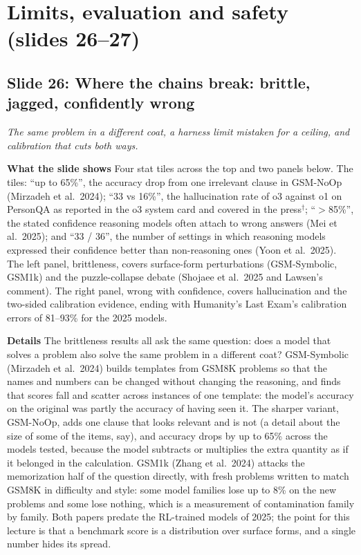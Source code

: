 \documentclass[11pt,letterpaper]{article}
\newcommand{\slide}[3]{%
  \subsection[Slide #1: #2]{Slide #1: #2}%
  {\color{muted}\itshape #3\par}\medskip}
\newcommand{\para}[1]{\medskip\noindent\textbf{#1}\quad}
\begin{document}
\section{Limits, evaluation and safety (slides 26--27)}

\slide{26}{Where the chains break: brittle, jagged, confidently wrong}{The same problem in a different coat, a harness limit mistaken for a ceiling, and calibration that cuts both ways.}

\para{What the slide shows} Four stat tiles across the top and two panels below. The tiles: ``up to 65\%'', the accuracy drop from one irrelevant clause in GSM-NoOp (Mirzadeh et al.\ 2024); ``33 vs 16\%'', the hallucination rate of o3 against o1 on PersonQA as reported in the o3 system card and covered in the press$^\dagger$; ``$>$85\%'', the stated confidence reasoning models often attach to wrong answers (Mei et al.\ 2025); and ``33 / 36'', the number of settings in which reasoning models expressed their confidence better than non-reasoning ones (Yoon et al.\ 2025). The left panel, brittleness, covers surface-form perturbations (GSM-Symbolic, GSM1k) and the puzzle-collapse debate (Shojaee et al.\ 2025 and Lawsen's comment). The right panel, wrong with confidence, covers hallucination and the two-sided calibration evidence, ending with Humanity's Last Exam's calibration errors of 81--93\% for the 2025 models.

\para{Details} The brittleness results all ask the same question: does a model that solves a problem also solve the same problem in a different coat? GSM-Symbolic (Mirzadeh et al.\ 2024) builds templates from GSM8K problems so that the names and numbers can be changed without changing the reasoning, and finds that scores fall and scatter across instances of one template: the model's accuracy on the original was partly the accuracy of having seen it. The sharper variant, GSM-NoOp, adds one clause that looks relevant and is not (a detail about the size of some of the items, say), and accuracy drops by up to 65\% across the models tested, because the model subtracts or multiplies the extra quantity as if it belonged in the calculation. GSM1k (Zhang et al.\ 2024) attacks the memorization half of the question directly, with fresh problems written to match GSM8K in difficulty and style: some model families lose up to 8\% on the new problems and some lose nothing, which is a measurement of contamination family by family. Both papers predate the RL-trained models of 2025; the point for this lecture is that a benchmark score is a distribution over surface forms, and a single number hides its spread.
\end{document}
